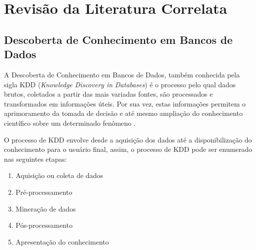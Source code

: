 \section{Revisão da Literatura Correlata} \label{sec:fundamentacao_teorica}

\subsection{Descoberta de Conhecimento em Bancos de Dados}
	\label{subsec:descoberta_conhecimento_bd}

A Descoberta de Conhecimento em Bancos de Dados, também conhecida pela sigla KDD 
(\emph{Knowledge Discovery in Databases}) é o processo pelo qual dados brutos,
coletados a partir das mais variadas fontes, são processados e transformados em
informações úteis. Por sua vez, estas informações permitem o aprimoramento da
tomada de decisão e até mesmo ampliação do conhecimento científico sobre um
determinado fenômeno \cite{tan2009introducao}.

O processo de KDD envolve desde a aquisição dos dados até a disponibilização do
conhecimento para o usuário final, assim, o processo de KDD pode ser enumerado
nas seguintes etapas:

\begin{enumerate}
    \item Aquisição ou coleta de dados
    \item Pré-processamento
    \item Mineração de dados
    \item Pós-processamento
    \item Apresentação do conhecimento
\end{enumerate}







